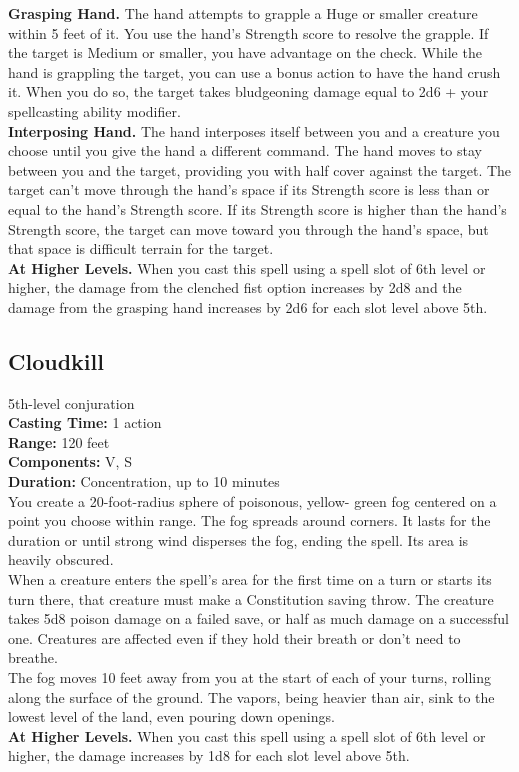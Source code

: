 \documentclass[11pt, A4paper, english]{article}
\begin{document}
\textbf{Grasping Hand.} The hand attempts to grapple a Huge or smaller creature within 5 feet of it. You use the hand’s Strength score to resolve the grapple. If the target is Medium or smaller, you have advantage on the check. While the hand is grappling the target, you can use a bonus action to have the hand crush it. When you do so, the target takes bludgeoning damage equal to 2d6 + your spellcasting ability modifier. \\
\textbf{Interposing Hand.} The hand interposes itself between you and a creature you choose until you give the hand a different command. The hand moves to stay between you and the target, providing you with half cover against the target. The target can't move through the hand’s space if its Strength score is less than or equal to the hand’s Strength score. If its Strength score is higher than the hand’s Strength score, the target can move toward you through the hand’s space, but that space is difficult terrain for the target. \\
\textbf{At Higher Levels.} When you cast this spell using a spell slot of 6th level or higher, the damage from the clenched fist option increases by 2d8 and the damage from the grasping hand increases by 2d6 for each slot level above 5th.

		\subsection{Cloudkill}
5th-level conjuration \\
\textbf{Casting Time:} 1 action \\
\textbf{Range:} 120 feet \\
\textbf{Components:} V, S \\
\textbf{Duration:} Concentration, up to 10 minutes \\
You create a 20-foot-radius sphere of poisonous, yellow- green fog centered on a point you choose within range. The fog spreads around corners. It lasts for the duration or until strong wind disperses the fog, ending the spell. Its area is heavily obscured. \\
When a creature enters the spell’s area for the first time on a turn or starts its turn there, that creature must make a Constitution saving throw. The creature takes 5d8 poison damage on a failed save, or half as much damage on a successful one. Creatures are affected even if they hold their breath or don’t need to breathe. \\
The fog moves 10 feet away from you at the start of each of your turns, rolling along the surface of the ground. The vapors, being heavier than air, sink to the lowest level of the land, even pouring down openings. \\
\textbf{At Higher Levels.} When you cast this spell using a spell slot of 6th level or higher, the damage increases by 1d8 for each slot level above 5th.
\end{document}
